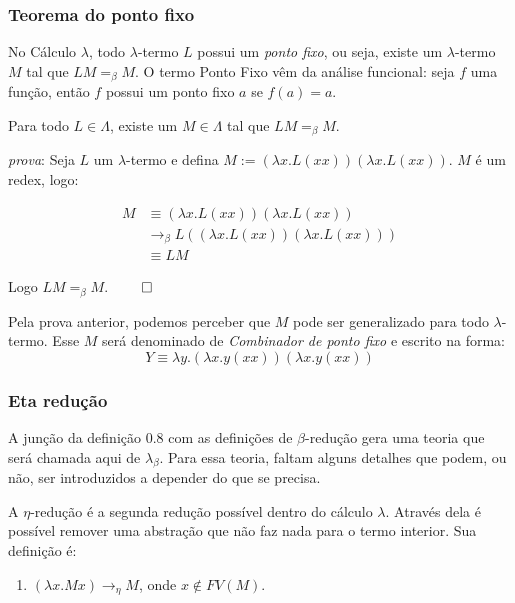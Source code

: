 \documentclass[../main.tex]{subfiles}
\begin{document}
\subsubsection{Teorema do ponto fixo}

No Cálculo $\lambda$, todo $\lambda$-termo $L$ possui um \emph{ponto fixo}, ou seja, existe um $\lambda$-termo $M$ tal que $LM =_{\beta} M$. O termo Ponto Fixo vêm da análise funcional: seja $f$ uma função, então $f$ possui um ponto fixo $a$ se $f(a) = a$. 

\begin{theorem}
    Para todo $L \in \Lambda$, existe um $M \in \Lambda$ tal que $LM =_{\beta} M$.
\end{theorem}

\emph{prova}: Seja $L$ um $\lambda$-termo e defina $M := (\lambda x . L (xx))(\lambda x . L (xx))$. $M$ é um redex, logo: 

\begin{equation*}
    \begin{split}
        M & \equiv (\lambda x . L (xx))(\lambda x . L (xx))
     \\   & \to_{\beta} L((\lambda x . L (xx))(\lambda x . L (xx)))
     \\   & \equiv LM
    \end{split}
\end{equation*}

Logo $LM =_{\beta} M$. $\qed$

Pela prova anterior, podemos perceber que $M$ pode ser generalizado para todo $\lambda$-termo. Esse $M$ será denominado de \emph{Combinador de ponto fixo} e escrito na forma: $$Y \equiv \lambda y . (\lambda x . y(xx))(\lambda x . y(xx)) $$

\subsubsection{Eta redução}

A junção da definição 0.8 com as definições de $\beta$-redução gera uma teoria que será chamada aqui de $\lambda_{\beta}$. Para essa teoria, faltam alguns detalhes que podem, ou não, ser introduzidos a depender do que se precisa.

A $\eta$-redução é a segunda redução possível dentro do cálculo $\lambda$. Através dela é possível remover uma abstração que não faz nada para o termo interior. Sua definição é:

\begin{definition}
    \hfill
    \begin{enumerate}
        \item $(\lambda x . M x) \rightarrow_{\eta} M$, onde $x \not\in FV(M)$.
    \end{enumerate}
\end{definition}
\end{document}

